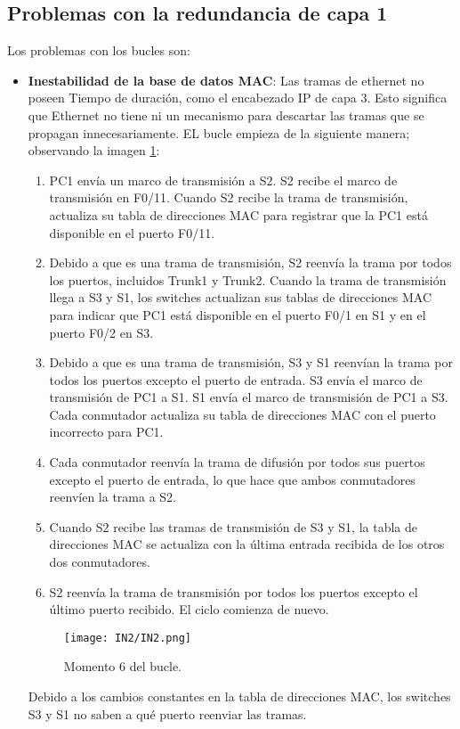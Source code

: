 \documentclass[
	12pt, %
	fleqn, %
	a4paper, %
	oneside, %
]{LegrandOrangeBook}
\begin{document}
\subsection{Problemas con la redundancia de capa 1}
Los problemas con los bucles son:
\begin{itemize}
\item \textbf{Inestabilidad de la base de datos MAC}: Las tramas de ethernet no poseen Tiempo de duración, como el encabezado IP de capa 3. Esto significa que Ethernet no tiene ni un mecanismo para descartar las tramas que se propagan innecesariamente. EL bucle empieza de la siguiente manera; observando la imagen  \ref{fig:inestabilidad spanning tree}:
\begin{enumerate}
\item PC1 envía un marco de transmisión a S2. S2 recibe el marco de transmisión en F0/11. Cuando S2 recibe la trama de transmisión, actualiza su tabla de direcciones MAC para registrar que la PC1 está disponible en el puerto F0/11.
\item Debido a que es una trama de transmisión, S2 reenvía la trama por todos los puertos, incluidos Trunk1 y Trunk2. Cuando la trama de transmisión llega a S3 y S1, los switches actualizan sus tablas de direcciones MAC para indicar que PC1 está disponible en el puerto F0/1 en S1 y en el puerto F0/2 en S3.
\item Debido a que es una trama de transmisión, S3 y S1 reenvían la trama por todos los puertos excepto el puerto de entrada. S3 envía el marco de transmisión de PC1 a S1. S1 envía el marco de transmisión de PC1 a S3. Cada conmutador actualiza su tabla de direcciones MAC con el puerto incorrecto para PC1.
\item Cada conmutador reenvía la trama de difusión por todos sus puertos excepto el puerto de entrada, lo que hace que ambos conmutadores reenvíen la trama a S2.
\item Cuando S2 recibe las tramas de transmisión de S3 y S1, la tabla de direcciones MAC se actualiza con la última entrada recibida de los otros dos conmutadores.
\item S2 reenvía la trama de transmisión por todos los puertos excepto el último puerto recibido. El ciclo comienza de nuevo.
\end{enumerate}
\begin{figure}[H]
\centering
\texttt{[image: IN2/IN2.png]}
\caption{Momento 6 del bucle.}
\label{fig:inestabilidad spanning tree}
\end{figure}
Debido a los cambios constantes en la tabla de direcciones MAC, los switches S3  y S1 no saben a qué puerto reenviar las tramas.

\end{itemize}
\end{document}
